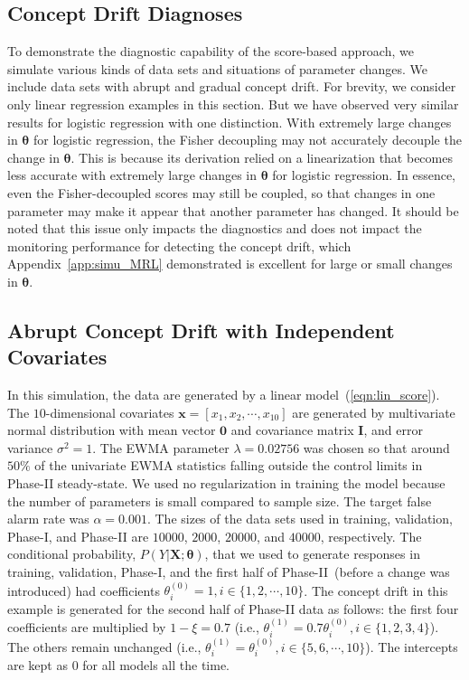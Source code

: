\documentclass[twoside,11pt]{article}
\begin{document}
\begin{appendices}
\section{Concept Drift Diagnoses}
\label{app:cd_diag}
To demonstrate the diagnostic capability of the score-based approach, we simulate various kinds of data sets and situations of parameter changes. We include data sets with abrupt and gradual concept drift. For brevity, we consider only linear regression examples in this section. But we have observed very similar results for logistic regression with one distinction. With extremely large changes in $\bm{\theta}$ for logistic regression, the Fisher decoupling may not accurately decouple the change in $\bm{\theta}$. This is because its derivation relied on a linearization that becomes less accurate with extremely large changes in $\bm{\theta}$ for logistic regression. In essence, even the Fisher-decoupled scores may still be coupled, so that changes in one parameter may make it appear that another parameter has changed. It should be noted that this issue only impacts the diagnostics and does not impact the monitoring performance for detecting the concept drift, which Appendix~\ref{app:simu_MRL} demonstrated is excellent for large or small changes in $\bm{\theta}$.  


\subsection{Abrupt Concept Drift with Independent Covariates}
\label{ssss:lin_ind_pred}
In this simulation, the data are generated by a {linear} model~(\ref{eqn:lin_score}). The $10$-dimensional {covariates} {$\bm {x}=[x_1, x_2, \cdots, x _{10}]$} are generated by multivariate normal distribution with mean vector $\bm{0}$ and covariance matrix $\mathbf{I}$, and error variance $\sigma^2=1$. The EWMA parameter $\lambda=0.02756$ was chosen so that around $50\%$ of the univariate EWMA statistics falling outside the control limits in Phase-II steady-state. We used no regularization in training the model because the number of parameters is small compared to sample size. The target false alarm rate was $\alpha=0.001$. The sizes of the data sets used in training, validation, Phase-I, and Phase-II are $10000$, $2000$, $20000$, and $40000$, respectively. The conditional probability, $P(Y|\bm{X}; \bm{\theta})$, that we used to generate responses in training, validation, Phase-I, and the first half of Phase-II~(before a change was introduced) had coefficients $\theta_i^{(0)}=1, i\in\{1,2,\cdots,10\}$. The concept drift in this example is generated for the second half of Phase-II data as follows: the first four coefficients are multiplied by $1-\xi=0.7$ (i.e., $\theta_i^{(1)}=0.7\theta_i^{(0)}, i\in\{1,2,3,4\}$). The others remain unchanged (i.e., $\theta_i^{(1)}=\theta_i^{(0)}, i\in\{5,6,\cdots,10\}$). The intercepts are kept as $0$ for all models all the time.


\end{appendices}
\end{document}
